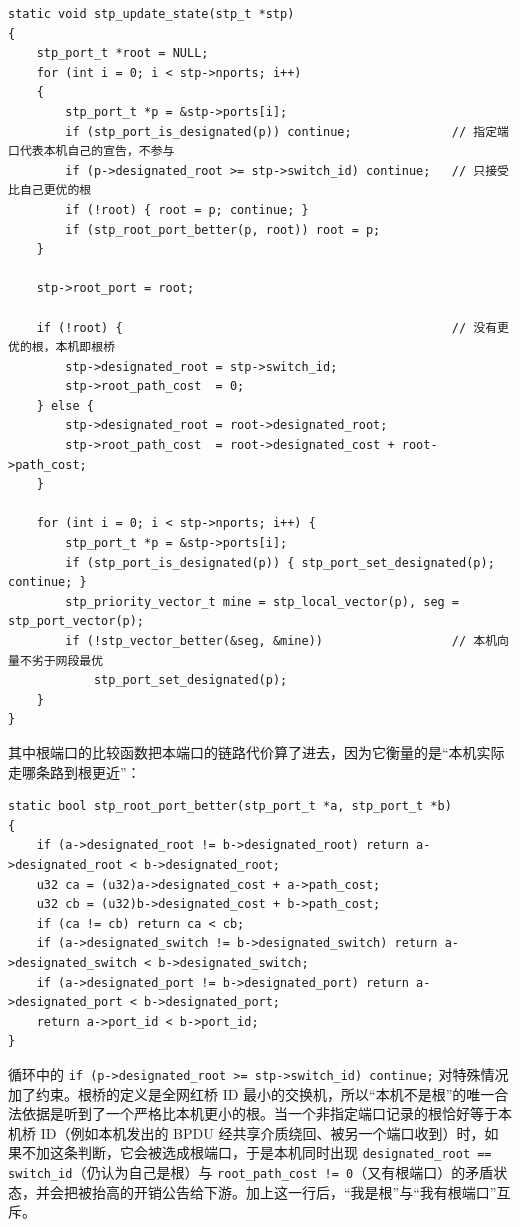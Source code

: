 \documentclass[UTF8,12pt,a4paper,fontset=fandol]{ctexart}
\begin{document}
\begin{verbatim}
static void stp_update_state(stp_t *stp)
{
    stp_port_t *root = NULL;
    for (int i = 0; i < stp->nports; i++)
    {
        stp_port_t *p = &stp->ports[i];
        if (stp_port_is_designated(p)) continue;              // 指定端口代表本机自己的宣告，不参与
        if (p->designated_root >= stp->switch_id) continue;   // 只接受比自己更优的根
        if (!root) { root = p; continue; }
        if (stp_root_port_better(p, root)) root = p;
    }

    stp->root_port = root;

    if (!root) {                                              // 没有更优的根，本机即根桥
        stp->designated_root = stp->switch_id;
        stp->root_path_cost  = 0;
    } else {
        stp->designated_root = root->designated_root;
        stp->root_path_cost  = root->designated_cost + root->path_cost;
    }

    for (int i = 0; i < stp->nports; i++) {
        stp_port_t *p = &stp->ports[i];
        if (stp_port_is_designated(p)) { stp_port_set_designated(p); continue; }
        stp_priority_vector_t mine = stp_local_vector(p), seg = stp_port_vector(p);
        if (!stp_vector_better(&seg, &mine))                  // 本机向量不劣于网段最优
            stp_port_set_designated(p);
    }
}
\end{verbatim}

其中根端口的比较函数把本端口的链路代价算了进去，因为它衡量的是“本机实际走哪条路到根更近”：

\begin{verbatim}
static bool stp_root_port_better(stp_port_t *a, stp_port_t *b)
{
    if (a->designated_root != b->designated_root) return a->designated_root < b->designated_root;
    u32 ca = (u32)a->designated_cost + a->path_cost;
    u32 cb = (u32)b->designated_cost + b->path_cost;
    if (ca != cb) return ca < cb;
    if (a->designated_switch != b->designated_switch) return a->designated_switch < b->designated_switch;
    if (a->designated_port != b->designated_port) return a->designated_port < b->designated_port;
    return a->port_id < b->port_id;
}
\end{verbatim}

循环中的 \texttt{if (p->designated\_root >= stp->switch\_id) continue;} 对特殊情况加了约束。根桥的定义是全网红桥 ID 最小的交换机，所以“本机不是根”的唯一合法依据是听到了一个严格比本机更小的根。当一个非指定端口记录的根恰好等于本机桥 ID（例如本机发出的 BPDU 经共享介质绕回、被另一个端口收到）时，如果不加这条判断，它会被选成根端口，于是本机同时出现 \texttt{designated\_root == switch\_id}（仍认为自己是根）与 \texttt{root\_path\_cost != 0}（又有根端口）的矛盾状态，并会把被抬高的开销公告给下游。加上这一行后，“我是根”与“我有根端口”互斥。
\end{document}
